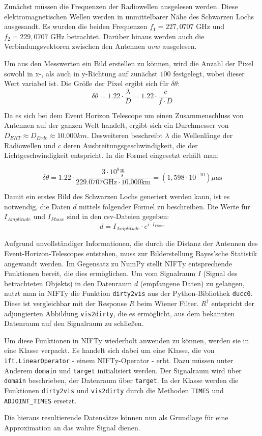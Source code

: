 Zunächst müssen die Frequenzen der Radiowellen ausgelesen werden. Diese elektromagnetischen Wellen werden in unmittelbarer Nähe des Schwarzen Lochs ausgesandt. Es wurden die beiden Frequenzen $f_1 = 227,0707$ GHz und $f_2 = 229,0707$ GHz betrachtet. Darüber hinaus werden auch die Verbindungsvektoren zwischen den Antennen $uvw$ ausgelesen.

Um aus den Messwerten ein Bild erstellen zu können, wird die Anzahl der Pixel sowohl in x-, als auch in y-Richtung auf zunächst $100$ festgelegt, wobei dieser Wert variabel ist. Die Größe der Pixel ergibt sich für $\delta \theta$:
\[ \delta \theta = 1.22 \cdot \displaystyle\frac{\lambda}{D} = 1.22 \cdot \displaystyle\frac{c}{f \cdot D} \]

Da es sich bei dem Event Horizon Telescope um einen Zusammenschluss von Antennen auf der ganzen Welt handelt, ergibt sich ein Durchmesser von $D_{EHT} \approx D_{Erde} \approx 10.000km$. Desweiteren beschreibt $\lambda$ die Wellenlänge der Radiowellen und $c$ deren Ausbreitungsgeschwindigkeit, die der Lichtgeschwindigkeit entspricht. In die Formel eingesetzt erhält man:

\begin{equation}
  \delta \theta = 1.22 \cdot \displaystyle\frac{3 \cdot 10^{8} \displaystyle\frac{\text{m}}{\text{s}}} {229.0707 \text{GHz} \cdot 10.000 \text{km}} = (1,598 \cdot 10^{-10}) \mu \text{as} 
\end{equation}

Damit ein erstes Bild des Schwarzen Lochs generiert werden kann, ist es notwendig, die Daten $d$ mittels folgender Formel zu beschreiben. Die Werte für $I_{Amplitude}$ und $I_{Phase}$ sind in den csv-Dateien gegeben:
\[ d = I_{Amplitude} \cdot e^{i \cdot I_{Phase}} \]

Aufgrund unvollständiger Informationen, die durch die Distanz der Antennen des Event-Horizon-Telescopes entstehen, muss zur Bilderstellung Bayes'sche Statistik angewandt werden. Im Gegensatz zu NumPy stellt NIFTy entsprechende Funktionen bereit, die dies ermöglichen. Um vom Signalraum $I$ (Signal des betrachteten Objekts) in den Datenraum $d$ (empfangene Daten) zu gelangen, nutzt man in NIFTy die Funktion \verb|dirty2vis| aus der Python-Bibliothek \verb|ducc0|. Diese ist vergleichbar mit der Response $R$ beim Wiener Filter. $R^{\dagger}$ entspricht der adjungierten Abbildung \verb|vis2dirty|, die es ermöglicht, aus dem bekannten Datenraum auf den Signalraum zu schließen.

Um diese Funktionen in NIFTy wiederholt anwenden zu können, werden sie in eine Klasse verpackt. Es handelt sich dabei um eine Klasse, die von \verb|ift.LinearOperator| - einem NIFTy-Operator - erbt. Dazu müssen unter Anderem \verb|domain| und \verb|target| initialisiert werden. Der Signalraum wird über \verb|domain| beschrieben, der Datenraum über \verb|target|. In der Klasse werden die Funktionen \verb|dirty2vis| und \verb|vis2dirty| durch die Methoden \verb|TIMES| und \verb|ADJOINT_TIMES| ersetzt.

Die hieraus resultierende Datensätze können nun als Grundlage für eine Approximation an das wahre Signal dienen.
